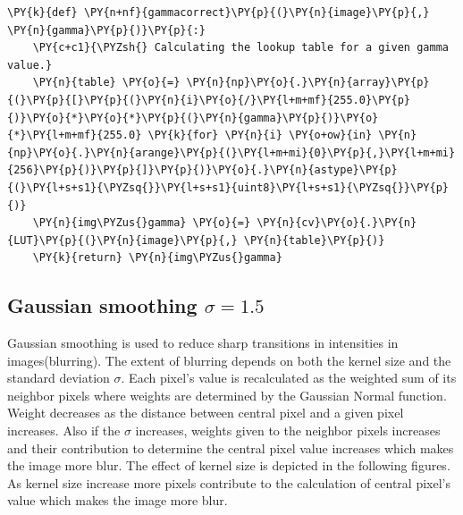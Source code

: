 \documentclass[a4paper,10pt]{article}%
\begin{document}
    \begin{tcolorbox}[breakable, size=fbox, boxrule=1pt, pad at break*=1mm,colback=cellbackground, colframe=cellborder]
\begin{Verbatim}[commandchars=\\\{\}]
\PY{k}{def} \PY{n+nf}{gammacorrect}\PY{p}{(}\PY{n}{image}\PY{p}{,} \PY{n}{gamma}\PY{p}{)}\PY{p}{:}
    \PY{c+c1}{\PYZsh{} Calculating the lookup table for a given gamma value.}
    \PY{n}{table} \PY{o}{=} \PY{n}{np}\PY{o}{.}\PY{n}{array}\PY{p}{(}\PY{p}{[}\PY{p}{(}\PY{n}{i}\PY{o}{/}\PY{l+m+mf}{255.0}\PY{p}{)}\PY{o}{*}\PY{o}{*}\PY{p}{(}\PY{n}{gamma}\PY{p}{)}\PY{o}{*}\PY{l+m+mf}{255.0} \PY{k}{for} \PY{n}{i} \PY{o+ow}{in} \PY{n}{np}\PY{o}{.}\PY{n}{arange}\PY{p}{(}\PY{l+m+mi}{0}\PY{p}{,}\PY{l+m+mi}{256}\PY{p}{)}\PY{p}{]}\PY{p}{)}\PY{o}{.}\PY{n}{astype}\PY{p}{(}\PY{l+s+s1}{\PYZsq{}}\PY{l+s+s1}{uint8}\PY{l+s+s1}{\PYZsq{}}\PY{p}{)}
    \PY{n}{img\PYZus{}gamma} \PY{o}{=} \PY{n}{cv}\PY{o}{.}\PY{n}{LUT}\PY{p}{(}\PY{n}{image}\PY{p}{,} \PY{n}{table}\PY{p}{)}
    \PY{k}{return} \PY{n}{img\PYZus{}gamma}
\end{Verbatim}
\end{tcolorbox}


\subsection{Gaussian smoothing $\sigma = 1.5$}
Gaussian smoothing is used to reduce sharp transitions in intensities in images(blurring). The extent of blurring depends on both the kernel size and the standard deviation $\sigma$. Each pixel's value is recalculated as the weighted sum of its neighbor pixels where weights are determined by the Gaussian Normal function. Weight decreases as the distance between central pixel and a given pixel increases. Also if the $\sigma$ increases, weights given to the neighbor pixels increases and their contribution to determine the central pixel value increases which makes the image more blur. The effect of kernel size is depicted in the following figures. As kernel size increase more pixels contribute to the calculation of central pixel's value which makes the image more blur.
\end{document}
